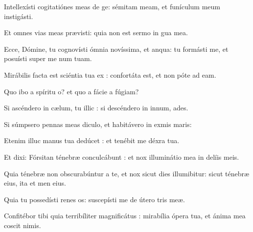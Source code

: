 \item {}

\item Intellexísti cogitatiónes meas de ge:\psstar{} sémitam meam, et funículum meum instigásti.

\item Et omnes vias meas prævisti:\psstar{} quia non est sermo in gua mea.

\item Ecce, Dómine, tu cognovísti ómnia novíssima, et anqua:\psstar{} tu formásti me, et posuísti super me num tuam.

\item Mirábilis facta est sciéntia tua ex :\psstar{} confortáta est, et non póte ad eam.

\item Quo ibo a spíritu o?\psstar{} et quo a fácie a fúgiam?

\item Si ascéndero in cælum, tu illic :\psstar{} si descéndero in innum, ades.

\item Si súmpsero pennas meas diculo,\psstar{} et habitávero in exmis maris:

\item Etenim illuc manus tua dedúcet :\psstar{} et tenébit me déxra tua.

\item Et dixi: Fórsitan ténebræ conculcábunt :\psstar{} et nox illuminátio mea in delíis meis.

\item Quia ténebræ non obscurabúntur a te, et nox sicut dies illumibitur:\psstar{} sicut ténebræ eius, ita et men eius.

\item Quia tu possedísti renes os:\psstar{} suscepísti me de útero tris meæ.

\item Confitébor tibi quia terribíliter magnificátus :\psstar{} mirabília ópera tua, et ánima mea coscit nimis.

